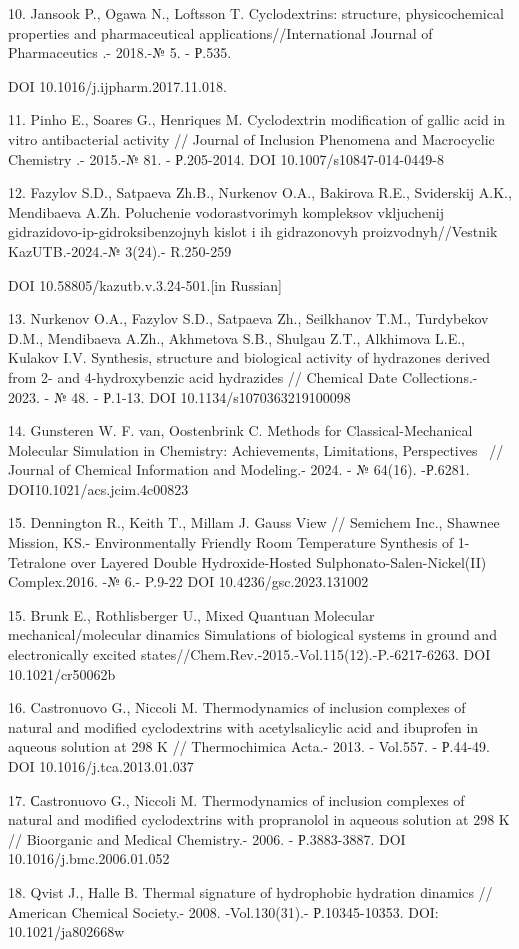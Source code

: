 \begin{references}
10. Jansook P., Ogawa N., Loftsson T. Cyclodextrins: structure,
physicochemical properties and pharma\-ceutical
applications//International Journal of Pharmaceutics .- 2018.-№
5. - Р.535.

DOI 10.1016/j.ijpharm.2017.11.018.

11. Pinho E., Soares G., Henriques M. Cyclodextrin modification of gallic
acid in vitro antibacterial activity // Journal of Inclusion Phenomena
and Macrocyclic Chemistry .- 2015.-№ 81. - Р.205-2014. DOI
10.1007/s10847-014-0449-8

12. Fazylov S.D., Satpaeva Zh.B., Nurkenov O.A., Bakirova R.E.,
Sviderskij A.K., Mendibaeva A.Zh. Poluchenie vodorastvorimyh kompleksov
vkljuchenij gidrazidovo-ip-gidroksibenzojnyh kislot i ih gidra\-zonovyh
proizvodnyh//Vestnik KazUTB.-2024.-№ 3(24).- R.250-259

DOI 10.58805/kazutb.v.3.24-501.{[}in Russian{]}

13. Nurkenov O.A., Fazylov S.D., Satpaeva Zh., Seilkhanov T.M.,
Turdybekov D.M., Mendibaeva A.Zh., Akhmetova S.B., Shulgau Z.T.,
Alkhimova L.E., Kulakov I.V. Synthesis, structure and biological
activity of hydrazones derived from 2- and 4-hydroxybenzic acid
hydrazides // Chemical Date Collections.- 2023. - № 48. - Р.1-13. DOI
10.1134/s1070363219100098~

14. Gunsteren W. F. van, Oostenbrink C. Methods for Classical-Mechanical
Molecular Simulation in Chemistry: Achievements, Limitations,
Perspectives~ // Journal of Chemical Information and Modeling.- 2024. -
№ 64(16). -Р.6281. DOI10.1021/acs.jcim.4c00823

15. Dennington R., Keith T., Millam J. Gauss View // Semichem Inc.,
Shawnee Mission, KS.- Environment\-ally Friendly Room Temperature
Synthesis of 1-Tetralone over Layered Double Hydroxide-Hosted
Sulph\-onato-Salen-Nickel(II) Complex.2016. -№ 6.- P.9-22
DOI 10.4236/gsc.2023.131002

15. Brunk E., Rothlisberger U., Mixed Quantuan Molecular
mechanical/molecular dinamics Simulations of biological systems in
ground and electronically excited
states//Chem.Rev.-2015.-Vol.115(12).-P.-6217-6263. DOI 10.1021/cr50062b

16. Castronuovo G., Niccoli M. Thermodynamics of inclusion complexes of
natural and modified cyclodex\-trins with acetylsalicylic acid and
ibuprofen in aqueous solution at 298 K // Thermochimica Acta.- 2013. -
Vol.557. - Р.44-49. DOI 10.1016/j.tca.2013.01.037~

17. Сastronuovo G., Niccoli M. Thermodynamics of inclusion complexes of
natural and modified cyclodex\-trins with propranolol in aqueous solution
at 298 K // Bioorganic and Medical Chemistry.- 2006. - Р.3883-3887. DOI
10.1016/j.bmc.2006.01.052

18. Qvist J., Halle B. Thermal signature of hydrophobic hydration
dinamics // American Chemical Society.- 2008. -Vol.130(31).-
Р.10345-10353. DOI: 10.1021/ja802668w
\end{references}

